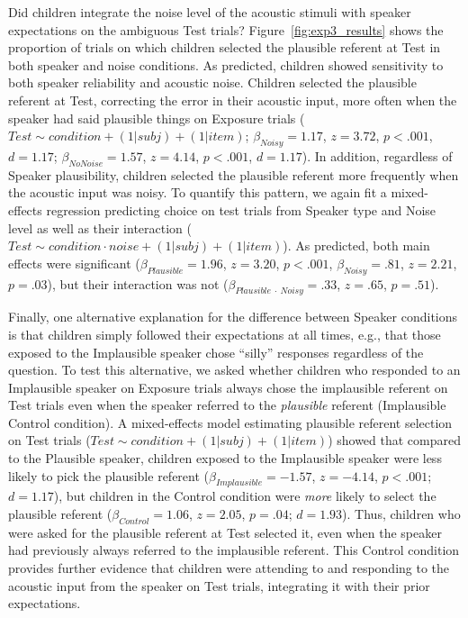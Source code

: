 \documentclass[man,floatsintext]{apa6}
\begin{document}
Did children integrate the noise level of the acoustic stimuli with speaker expectations on the ambiguous Test trials? Figure~\ref{fig:exp3_results} shows the proportion of trials on which children selected the plausible referent at Test in both speaker and noise conditions. As predicted, children showed sensitivity to both speaker reliability and acoustic noise. Children selected the plausible referent at Test, correcting the error in their acoustic input, more often when the speaker had said plausible things on Exposure trials ($Test \sim condition + (1|subj) + (1|item)$; $\beta_{Noisy} = 1.17$, $z =3.72$, $p < .001$, $d = 1.17$; $\beta_{No Noise} = 1.57$, $z = 4.14$, $p < .001$, $d = 1.17$). In addition, regardless of Speaker plausibility, children selected the plausible referent more frequently when the acoustic input was noisy. To quantify this pattern, we again fit a mixed-effects regression predicting choice on test trials from Speaker type and Noise level as well as their interaction ($Test \sim condition \cdot noise + (1|subj) + (1|item)$). As predicted, both main effects were significant ($\beta_{Plausible} = 1.96$,  $z = 3.20$, $p <.001$, $\beta_{Noisy} = .81$,  $z = 2.21$, $p = .03$), but their interaction was not ($\beta_{Plausible \: \cdot \: Noisy} = .33$,  $z = .65$, $p = .51$).

Finally, one alternative explanation for the difference between Speaker conditions is that children simply followed their expectations at all times, e.g., that those exposed to the Implausible speaker chose ``silly'' responses regardless of the question. To test this alternative, we asked whether children who responded to an Implausible speaker on Exposure trials always chose the implausible referent on Test trials even when the speaker referred to the \emph{plausible} referent (Implausible Control condition). A mixed-effects model estimating plausible referent selection on Test trials ($Test \sim condition + (1|subj) + (1|item)$) showed that compared to the Plausible speaker, children exposed to the Implausible speaker were less likely to pick the plausible referent ($\beta_{Implausible} = -1.57$,  $z = -4.14$, $p <.001$; $d = 1.17$), but children in the Control condition were \emph{more} likely to select the plausible referent ($\beta_{Control} = 1.06$,  $z = 2.05$, $p = .04$; $d = 1.93$). Thus, children who were asked for the plausible referent at Test selected it, even when the speaker had previously always referred to the implausible referent. This Control condition provides further evidence that children were attending to and responding to the acoustic input from the speaker on Test trials, integrating it with their prior expectations.
\end{document}
